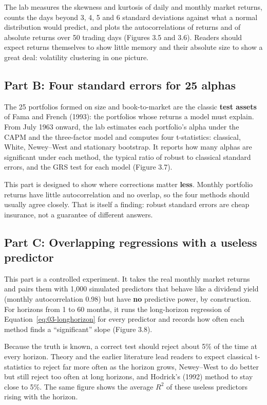 The lab measures the skewness and kurtosis of daily and monthly market returns, counts the days beyond 3, 4, 5 and 6 standard deviations against what a normal distribution would predict, and plots the autocorrelations of returns and of absolute returns over 50 trading days (Figures 3.5 and 3.6). Readers should expect returns themselves to show little memory and their absolute size to show a great deal: volatility clustering in one picture.

\subsection*{Part B: Four standard errors for 25 alphas}

The 25 portfolios formed on size and book-to-market are the classic \textbf{test assets} of Fama and French (1993): the portfolios whose returns a model must explain. From July 1963 onward, the lab estimates each portfolio's alpha under the CAPM and the three-factor model and computes four t-statistics: classical, White, Newey--West and stationary bootstrap. It reports how many alphas are significant under each method, the typical ratio of robust to classical standard errors, and the GRS test for each model (Figure 3.7).

This part is designed to show where corrections matter \textbf{less}. Monthly portfolio returns have little autocorrelation and no overlap, so the four methods should usually agree closely. That is itself a finding: robust standard errors are cheap insurance, not a guarantee of different answers.

\subsection*{Part C: Overlapping regressions with a useless predictor}

This part is a controlled experiment. It takes the real monthly market returns and pairs them with 1,000 simulated predictors that behave like a dividend yield (monthly autocorrelation 0.98) but have \textbf{no} predictive power, by construction. For horizons from 1 to 60 months, it runs the long-horizon regression of Equation~\eqref{eq:03-longhorizon} for every predictor and records how often each method finds a ``significant'' slope (Figure 3.8).

Because the truth is known, a correct test should reject about 5\% of the time at every horizon. Theory and the earlier literature lead readers to expect classical t-statistics to reject far more often as the horizon grows, Newey--West to do better but still reject too often at long horizons, and Hodrick's (1992) method to stay close to 5\%. The same figure shows the average $R^2$ of these useless predictors rising with the horizon.


